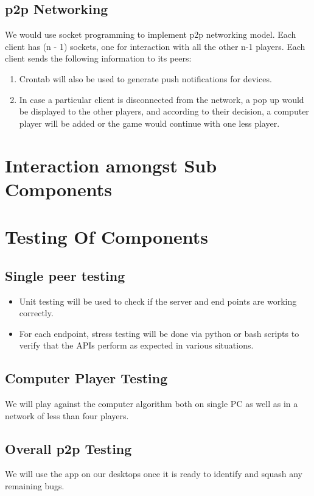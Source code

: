 \documentclass{article}
\begin{document}
			\subsection{p2p Networking}
			\par\noindent We would use socket programming to implement p2p networking model. Each client has (n - 1) sockets, one for interaction with all the other n-1 players. Each client sends the following information to its peers:
				\begin{enumerate}
					\item Crontab will also be used to generate push notifications for devices.
					\item In case a particular client is disconnected from the network, a pop up would be displayed to the other players, and according to their decision, a computer player will be added or the game would continue with one less player.
				\end{enumerate}
			

	\section{Interaction amongst Sub Components}
	
	\section{Testing Of Components}
			\subsection{Single peer testing}
				\begin{itemize}
					\item Unit testing will be used to check if the server and end points are working correctly.
					\item For each endpoint, stress testing will be done via python or bash scripts to verify that the APIs perform as expected in various situations.
				\end{itemize}

			\subsection{Computer Player Testing}
			We will play against the computer algorithm both on single PC as well as in a network of less than four players.
			\subsection{Overall p2p Testing}
				We will use the app on our desktops once it is ready to identify and squash any remaining bugs.
\end{document}
